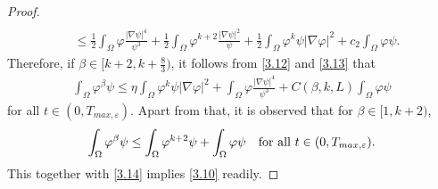\documentclass[12pt]{article}
\theoremstyle{plain}
\theoremstyle{definition}
\numberwithin{equation}{section}
\begin{document}
\begin{proof}
\begin{align}
    \\
     &\leq\frac{1}{2}\int_{\Omega}\varphi\frac{|\nabla
     \psi|^4}{\psi^3}+\frac{1}{2}\int_{\Omega}\varphi^{k+2}\frac{|\nabla
     \psi|^2}{\psi}+\frac{1}{2}\int_{\Omega}\varphi^{k}\psi|\nabla
    \varphi|^2+c_2\int_{\Omega}\varphi\psi.
\end{align}
 Therefore, if $\beta \in [k+2,k+\frac{8}{3})$, it follows from \eqref{3.12} and \eqref{3.13}  that
\begin{align} \label{3.14}
\int_{\Omega}\varphi^{\beta}\psi\leq \eta \int_{\Omega}\varphi^{k}\psi|\nabla \varphi|^2+
\int_{\Omega}\varphi\frac{|\nabla \psi|^4}{\psi^3}+C(\beta, k, L)\int_{\Omega}\varphi\psi
\end{align}
for all $t\in (0,T_{max,\varepsilon})$.
 Apart from that, it is observed that for $\beta \in [1,k+2)$,
$$ \int_{\Omega}\varphi^{\beta}\psi\leq  \int_{\Omega}\varphi^{k+2}\psi+
\int_{\Omega}\varphi\psi\quad \hbox{for all} \,\, t\in (0,T_{max,\varepsilon}).
$$
This together with \eqref{3.14} implies \eqref{3.10} readily.
\end{proof}
\end{document}
